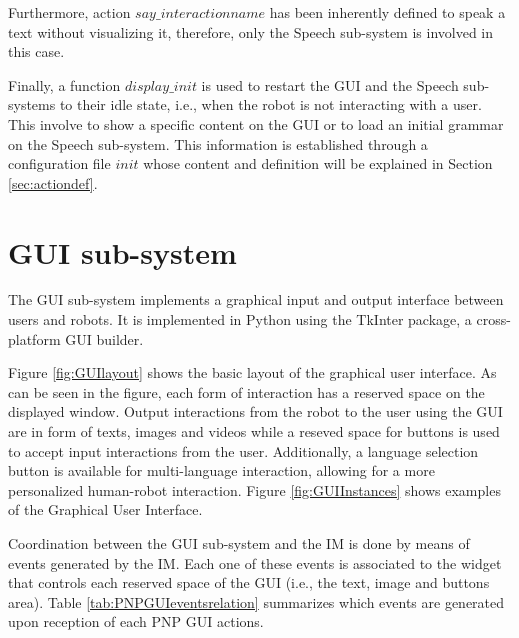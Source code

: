 \documentclass[11pt,a4paper]{article}
\begin{document}
Furthermore, action $say\_interactionname$ has been inherently defined to speak a text without visualizing it, therefore, only the Speech sub-system is involved in this case.

Finally, a function $display\_init$ is used to restart the GUI and the Speech sub-systems to their idle state, i.e., when the robot is not interacting with a user. This involve to show a specific content on the GUI or to load an initial grammar on the Speech sub-system.
This information is established through a configuration file $init$ whose content and definition will be explained in Section \ref{sec:actiondef}.

\section{GUI sub-system}
\label{sec:GUI}
The GUI sub-system implements a graphical input and output interface between users and robots. 
It is implemented in Python using the TkInter package, a cross-platform GUI builder.

Figure \ref{fig:GUIlayout} shows the basic layout of the graphical user interface. As can be seen in the figure, each form of interaction has a reserved space on the displayed window. Output interactions from the robot to the user using the GUI are in form of texts, images and videos while a reseved space for buttons is used to accept input interactions from the user. Additionally, a language selection button is available for multi-language interaction, allowing for a more personalized human-robot interaction. Figure \ref{fig:GUIInstances} shows examples of the Graphical User Interface.

Coordination between the GUI sub-system and the IM is done by means of events generated by the IM. Each one of these events is associated to the widget that controls each reserved space of the GUI (i.e., the text, image and buttons area). Table \ref{tab:PNPGUIeventsrelation} summarizes which events are generated upon reception of each PNP GUI actions.
\end{document}
